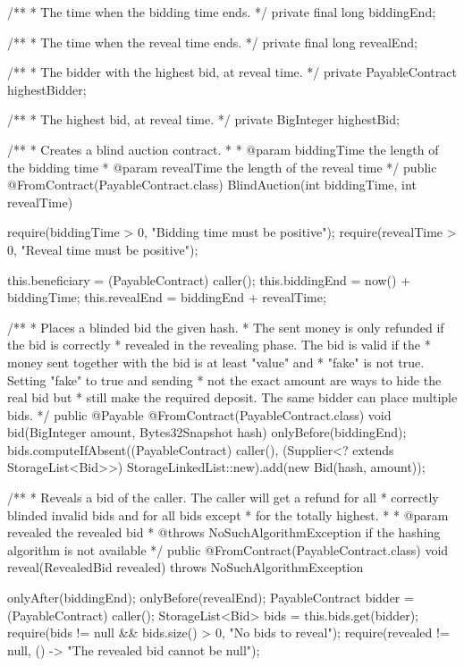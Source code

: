 \begin{codebox}
\begin{javalst}
{  /**
  * The time when the bidding time ends.
  */
  private final long biddingEnd;

  /**
  * The time when the reveal time ends.
  */
  private final long revealEnd;

  /**
  * The bidder with the highest bid, at reveal time.
  */
  private PayableContract highestBidder;

  /**
  * The highest bid, at reveal time.
  */
  private BigInteger highestBid;

  /**
  * Creates a blind auction contract.
  * 
  * @param biddingTime the length of the bidding time
  * @param revealTime the length of the reveal time
  */
  public @FromContract(PayableContract.class) BlindAuction(int biddingTime, int revealTime) {
    require(biddingTime > 0, "Bidding time must be positive");
    require(revealTime > 0, "Reveal time must be positive");

    this.beneficiary = (PayableContract) caller();
    this.biddingEnd = now() + biddingTime;
    this.revealEnd = biddingEnd + revealTime;
  }

  /**
  * Places a blinded bid the given hash.
  * The sent money is only refunded if the bid is correctly
  * revealed in the revealing phase. The bid is valid if the
  * money sent together with the bid is at least "value" and
  * "fake" is not true. Setting "fake" to true and sending
  * not the exact amount are ways to hide the real bid but
  * still make the required deposit. The same bidder can place multiple bids.
  */
  public @Payable @FromContract(PayableContract.class) void bid(BigInteger amount, Bytes32Snapshot hash) {
    onlyBefore(biddingEnd);
    bids.computeIfAbsent((PayableContract) caller(),
     (Supplier<? extends StorageList<Bid>>) StorageLinkedList::new).add(new Bid(hash, amount));
  }

  /**
  * Reveals a bid of the caller. The caller will get a refund for all
  * correctly blinded invalid bids and for all bids except
  * for the totally highest.
  * 
  * @param revealed the revealed bid
  * @throws NoSuchAlgorithmException if the hashing algorithm is not available
  */
  public @FromContract(PayableContract.class) void reveal(RevealedBid revealed)
      throws NoSuchAlgorithmException {
    onlyAfter(biddingEnd);
    onlyBefore(revealEnd);
    PayableContract bidder = (PayableContract) caller();
    StorageList<Bid> bids = this.bids.get(bidder);
    require(bids != null && bids.size() > 0, "No bids to reveal");
    require(revealed != null, () -> "The revealed bid cannot be null");

}}
\end{javalst}
\end{codebox}
